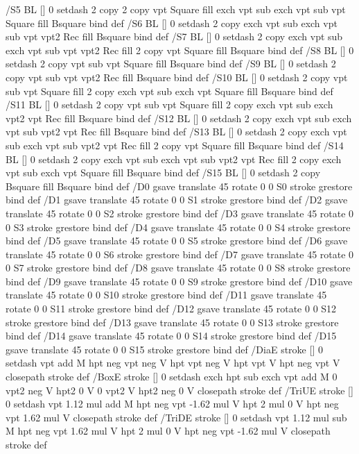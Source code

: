 {{{/S5 {BL [] 0 setdash 2 copy 2 copy vpt Square fill
	exch vpt sub exch vpt sub vpt Square fill Bsquare} bind def
/S6 {BL [] 0 setdash 2 copy exch vpt sub exch vpt sub vpt vpt2 Rec fill Bsquare} bind def
/S7 {BL [] 0 setdash 2 copy exch vpt sub exch vpt sub vpt vpt2 Rec fill
	2 copy vpt Square fill Bsquare} bind def
/S8 {BL [] 0 setdash 2 copy vpt sub vpt Square fill Bsquare} bind def
/S9 {BL [] 0 setdash 2 copy vpt sub vpt vpt2 Rec fill Bsquare} bind def
/S10 {BL [] 0 setdash 2 copy vpt sub vpt Square fill 2 copy exch vpt sub exch vpt Square fill
	Bsquare} bind def
/S11 {BL [] 0 setdash 2 copy vpt sub vpt Square fill 2 copy exch vpt sub exch vpt2 vpt Rec fill
	Bsquare} bind def
/S12 {BL [] 0 setdash 2 copy exch vpt sub exch vpt sub vpt2 vpt Rec fill Bsquare} bind def
/S13 {BL [] 0 setdash 2 copy exch vpt sub exch vpt sub vpt2 vpt Rec fill
	2 copy vpt Square fill Bsquare} bind def
/S14 {BL [] 0 setdash 2 copy exch vpt sub exch vpt sub vpt2 vpt Rec fill
	2 copy exch vpt sub exch vpt Square fill Bsquare} bind def
/S15 {BL [] 0 setdash 2 copy Bsquare fill Bsquare} bind def
/D0 {gsave translate 45 rotate 0 0 S0 stroke grestore} bind def
/D1 {gsave translate 45 rotate 0 0 S1 stroke grestore} bind def
/D2 {gsave translate 45 rotate 0 0 S2 stroke grestore} bind def
/D3 {gsave translate 45 rotate 0 0 S3 stroke grestore} bind def
/D4 {gsave translate 45 rotate 0 0 S4 stroke grestore} bind def
/D5 {gsave translate 45 rotate 0 0 S5 stroke grestore} bind def
/D6 {gsave translate 45 rotate 0 0 S6 stroke grestore} bind def
/D7 {gsave translate 45 rotate 0 0 S7 stroke grestore} bind def
/D8 {gsave translate 45 rotate 0 0 S8 stroke grestore} bind def
/D9 {gsave translate 45 rotate 0 0 S9 stroke grestore} bind def
/D10 {gsave translate 45 rotate 0 0 S10 stroke grestore} bind def
/D11 {gsave translate 45 rotate 0 0 S11 stroke grestore} bind def
/D12 {gsave translate 45 rotate 0 0 S12 stroke grestore} bind def
/D13 {gsave translate 45 rotate 0 0 S13 stroke grestore} bind def
/D14 {gsave translate 45 rotate 0 0 S14 stroke grestore} bind def
/D15 {gsave translate 45 rotate 0 0 S15 stroke grestore} bind def
/DiaE {stroke [] 0 setdash vpt add M
  hpt neg vpt neg V hpt vpt neg V
  hpt vpt V hpt neg vpt V closepath stroke} def
/BoxE {stroke [] 0 setdash exch hpt sub exch vpt add M
  0 vpt2 neg V hpt2 0 V 0 vpt2 V
  hpt2 neg 0 V closepath stroke} def
/TriUE {stroke [] 0 setdash vpt 1.12 mul add M
  hpt neg vpt -1.62 mul V
  hpt 2 mul 0 V
  hpt neg vpt 1.62 mul V closepath stroke} def
/TriDE {stroke [] 0 setdash vpt 1.12 mul sub M
  hpt neg vpt 1.62 mul V
  hpt 2 mul 0 V
  hpt neg vpt -1.62 mul V closepath stroke} def
}}}
